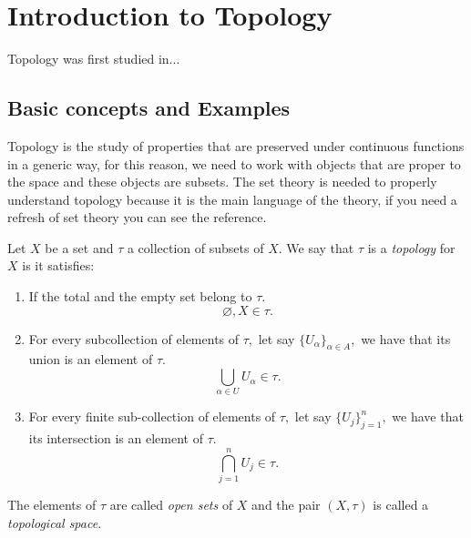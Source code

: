 \documentclass[
	fontsize=10pt, %
	twoside=false, %
	secnumdepth=1, %
]{kaobook}
\begin{document}
\listoftables %

\endgroup


\mainmatter %

\chapter{Introduction to Topology}


Topology was first studied in...

\section{Basic concepts and Examples}

Topology is the study of properties that are preserved under continuous functions in a generic way, for this reason, we need to work with objects that are proper to the space and these objects are subsets. The set theory is needed to properly understand topology because it is the main language of the theory, if you need a refresh of set theory you can see the reference.

\begin{definition}
Let $X$ be a set and $\tau$ a collection of subsets of $X.$ We say that $\tau$ is a \emph{topology} for $X$ is it satisfies:
\begin{enumerate}
\item If the total and the empty set belong to $\tau.$  $$\varnothing, X\in\tau.$$

\item For every subcollection of elements of $\tau,$ let say $\{U_\alpha\}_{\alpha\in A},$ we have that its union is an element of $\tau.$ $$\bigcup_{\alpha \in U} U_\alpha \in \tau.$$

\item For every finite sub-collection of elements of $\tau,$ let say $\{U_j\}_{j=1}^n,$ we have that its intersection is an element of $\tau.$ $$ \bigcap_{j=1}^n U_j\in\tau.$$
\end{enumerate}

The elements of $\tau$ are called \emph{open sets} of $X$ and the pair $(X,\tau)$ is called a \emph{topological space}.
\end{definition}
\end{document}
